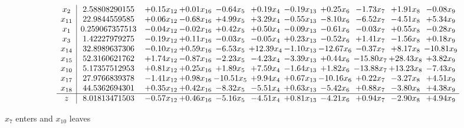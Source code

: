 \documentclass[9pt]{article}
\begin{document}
 \[\begin{array}{c| c c@{\hskip 2pt} c@{\hskip 2pt} c@{\hskip 2pt} c@{\hskip 2pt} c@{\hskip 2pt} c@{\hskip 2pt} c@{\hskip 2pt} c@{\hskip 2pt} c@{\hskip 2pt} }
 x_{2}   &  2.58808290155 & +  0.15 x_{12} & +  0.01 x_{16} & -0.64 x_{5} & +  0.19 x_{4} & -0.19 x_{13} & +  0.25 x_{6} & -1.73 x_{7} & +  1.91 x_{8} & -0.08 x_{9}\\
 x_{11}   &  22.9844559585 & +  0.06 x_{12} & -0.68 x_{16} & +  4.99 x_{5} & +  3.29 x_{4} & -0.55 x_{13} & -8.10 x_{6} & -6.52 x_{7} & -4.51 x_{8} & +  5.34 x_{9}\\
 x_{1}   &  0.259067357513 & -0.04 x_{12} & -0.02 x_{16} & +  0.42 x_{5} & +  0.50 x_{4} & -0.09 x_{13} & -0.61 x_{6} & -0.03 x_{7} & +  0.55 x_{8} & -0.28 x_{9}\\
 x_{3}   &  1.42227979275 & -0.19 x_{12} & +  0.11 x_{16} & -0.03 x_{5} & -0.05 x_{4} & +  0.23 x_{13} & -0.52 x_{6} & +  1.41 x_{7} & -1.56 x_{8} & +  0.18 x_{9}\\
 x_{14}   &  32.8989637306 & -0.10 x_{12} & +  0.59 x_{16} & -6.53 x_{5} & + 12.39 x_{4} & -1.10 x_{13} & -12.67 x_{6} & -0.37 x_{7} & +  8.17 x_{8} & -10.81 x_{9}\\
 x_{15}   &  52.3160621762 & +  1.74 x_{12} & -0.87 x_{16} & -2.23 x_{5} & -4.23 x_{4} & -3.39 x_{13} & +  0.44 x_{6} & -15.80 x_{7} & + 28.43 x_{8} & +  3.82 x_{9}\\
 x_{10}   &  5.17357512953 & +  0.81 x_{12} & +  0.25 x_{16} & +  1.89 x_{5} & +  7.59 x_{4} & -1.64 x_{13} & +  1.82 x_{6} & -13.88 x_{7} & + 13.23 x_{8} & -7.43 x_{9}\\
 x_{17}   &  27.9766839378 & -1.41 x_{12} & +  0.98 x_{16} & -10.51 x_{5} & +  9.94 x_{4} & +  0.67 x_{13} & -10.16 x_{6} & +  0.22 x_{7} & -3.27 x_{8} & +  4.51 x_{9}\\
 x_{18}   &  44.5362694301 & +  0.35 x_{12} & +  0.42 x_{16} & -8.32 x_{5} & -5.51 x_{4} & +  0.63 x_{13} & -5.42 x_{6} & +  0.88 x_{7} & -3.80 x_{8} & +  4.38 x_{9}\\
\hline
z    &  8.01813471503 & -0.57 x_{12} & +  0.46 x_{16} & -5.16 x_{5} & -4.51 x_{4} & +  0.81 x_{13} & -4.21 x_{6} & +  0.94 x_{7} & -2.90 x_{8} & +  4.94 x_{9}\\
\end{array}\]


 $ x_{7} $ enters and $ x_{10} $ leaves 
\end{document}

